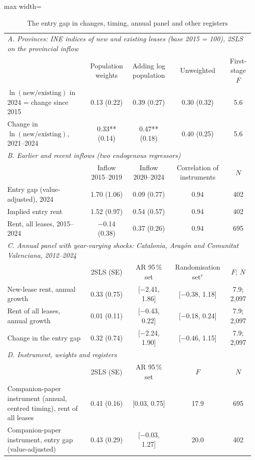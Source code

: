 \begin{table}[!htbp]\centering\small
\caption{The entry gap in changes, timing, annual panel and other registers}\label{tab:timing}
\begin{adjustbox}{max width=\linewidth}\begin{tabular}{lcccc}\toprule
\multicolumn{5}{l}{\textit{A. Provinces: INE indices of new and existing leases (base 2015 = 100), 2SLS on the provincial inflow}}\\
 & Population weights & Adding log population & Unweighted & First-stage $F$\\
$\ln(\text{new}/\text{existing})$ in 2024 = change since 2015 & 0.13 (0.22) & 0.39 (0.27) & 0.30 (0.32) & 5.6\\
Change in $\ln(\text{new}/\text{existing})$, 2021--2024 & 0.33** (0.14) & 0.47** (0.18) & 0.40 (0.25) & 5.6\\
\midrule
\multicolumn{5}{l}{\textit{B. Earlier and recent inflows (two endogenous regressors)}}\\
 & Inflow 2015--2019 & Inflow 2020--2024 & Correlation of instruments & $N$\\
Entry gap (value-adjusted), 2024 & 1.70 (1.06) & 0.09 (0.77) & 0.94 & 402\\
Implied entry rent & 1.52 (0.97) & 0.54 (0.57) & 0.94 & 402\\
Rent, all leases, 2015--2024 & $-$0.14 (0.38) & 0.37 (0.26) & 0.94 & 695\\
\midrule
\multicolumn{5}{l}{\textit{C. Annual panel with year-varying shocks: Catalonia, Aragón and Comunitat Valenciana, 2012--2024}}\\
 & 2SLS (SE) & AR 95\,\% set & Randomisation set$^r$ & $F$; $N$\\
New-lease rent, annual growth & 0.33 (0.75) & [$-$2.41, 1.86] & [$-$0.38, 1.18] & 7.9; 2,097\\
Rent of all leases, annual growth & 0.01 (0.11) & [$-$0.43, 0.22] & [$-$0.18, 0.24] & 7.9; 2,097\\
Change in the entry gap & 0.32 (0.74) & [$-$2.24, 1.90] & [$-$0.46, 1.15] & 7.9; 2,097\\
\midrule
\multicolumn{5}{l}{\textit{D. Instrument, weights and registers}}\\
 & 2SLS (SE) & AR 95\,\% set & $F$ & $N$\\
Companion-paper instrument (annual, centred timing), rent of all leases & 0.41 (0.16) & [0.03, 0.75] & 17.9 & 695\\
Companion-paper instrument, entry gap (value-adjusted) & 0.43 (0.29) & [$-$0.03, 1.27] & 20.0 & 402\\

\end{tabular}
\end{adjustbox}
\end{table}
